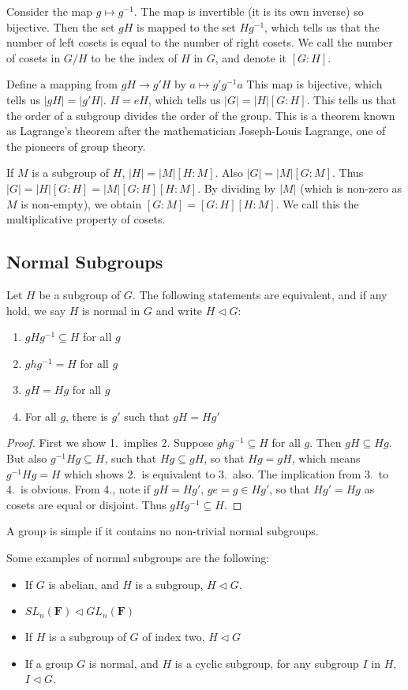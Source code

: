 \documentclass{report}
\begin{document}
Consider the map $g \mapsto g^{-1}$. The map is invertible (it is its own inverse) so bijective. Then the set $gH$ is mapped to the set $Hg^{-1}$, which tells us that the number of left cosets is equal to the number of right cosets. We call the number of cosets in $G/H$ to be the index of $H$ in $G$, and denote it $[G:H]$.

Define a mapping from $gH \to g'H$ by $a \mapsto g'g^{-1}a$ This map is bijective, which tells us $|gH| = |g'H|$. $H = eH$, which tells us $|G| = |H|[G:H]$. This tells us that the order of a subgroup divides the order of the group. This is a theorem known as Lagrange's theorem after the mathematician Joseph-Louis Lagrange, one of the pioneers of group theory.

If $M$ is a subgroup of $H$, $|H| = |M|[H:M]$. Also $|G| = |M|[G:M]$. Thus $|G| = |H|[G:H] = |M|[G:H][H:M]$. By dividing by $|M|$ (which is non-zero as $M$ is non-empty), we obtain $[G:M] = [G:H][H:M]$. We call this the multiplicative property of cosets.

\subsection{Normal Subgroups}

Let $H$ be a subgroup of $G$. The following statements are equivalent, and if any hold, we say $H$ is normal in $G$ and write $H \lhd G$:
\begin{enumerate}
    \item $gHg^{-1} \subseteq H$ for all $g$
    \item $ghg^{-1} = H$ for all $g$
    \item $gH = Hg$ for all $g$
    \item For all $g$, there is $g'$ such that $gH = Hg'$
\end{enumerate}
\begin{proof}
    First we show 1.\ implies 2. Suppose $ghg^{-1} \subseteq H$ for all $g$. Then $gH \subseteq Hg$. But also $g^{-1}Hg \subseteq H$, such that $Hg \subseteq gH$, so that $Hg = gH$, which means $g^{-1}Hg = H$ which shows 2.\ is equivalent to 3.\ also. The implication from 3.\ to 4.\ is obvious. From 4., note if $gH = Hg'$, $ge = g \in Hg'$, so that $Hg' = Hg$ as cosets are equal or disjoint. Thus $gHg^{-1} \subseteq H$.
\end{proof}

A group is simple if it contains no non-trivial normal subgroups.

Some examples of normal subgroups are the following:
\begin{itemize}
    \item If $G$ is abelian, and $H$ is a subgroup, $H \lhd G$.
    \item $SL_n(\mathbf{F}) \lhd GL_n(\mathbf{F})$
    \item If $H$ is a subgroup of $G$ of index two, $H \lhd G$
    \item If a group $G$ is normal, and $H$ is a cyclic subgroup, for any subgroup $I$ in $H$, $I \lhd G$.
\end{itemize}
\end{document}

